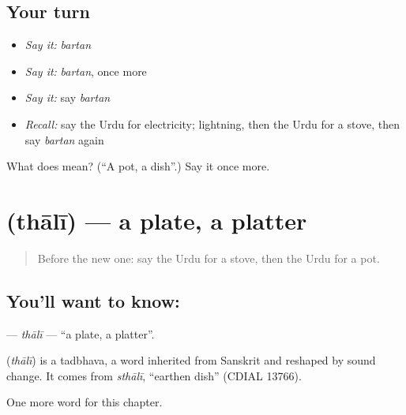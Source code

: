 \subsection*{Your turn}
\begin{itemize}
\raggedright
  \item \emph{Say it:} \emph{bartan}
  \item \emph{Say it:} \emph{bartan}, once more
  \item \emph{Say it:} say \emph{bartan}
  \item \emph{Recall:} say the Urdu for electricity; lightning, then the Urdu for a stove, then say \emph{bartan} again
\end{itemize}

\begin{tcolorbox}[breakable,colback=teal!4,colframe=teal!35!black,title={Before you move on}]
What does  mean? (\textquotedblleft{}A pot, a dish\textquotedblright{}.) Say it once more.
\end{tcolorbox}
\section[\texorpdfstring{\ur{تھالی} (thālī)}{تھالی (thālī)}]{ (thālī) — a plate, a platter}

\label{lesson:UR-C109-thali}



\begin{quote}
Before the new one: say the Urdu for a stove, then the Urdu for a pot.
\end{quote}

\subsection*{You'll want to know: }
\textbf{} — \emph{thālī} — \textquotedblleft{}a plate, a platter\textquotedblright{}.

\begin{cousinweb}
\textbf{} (\emph{thālī}) is a tadbhava, a word inherited from Sanskrit and reshaped by sound change. It comes from \emph{sthālī}, \textquotedblleft{}earthen dish\textquotedblright{} (CDIAL 13766).
\end{cousinweb}

\begin{grammarlens}[title={What you've built}]
One more word for this chapter.
\end{grammarlens}

